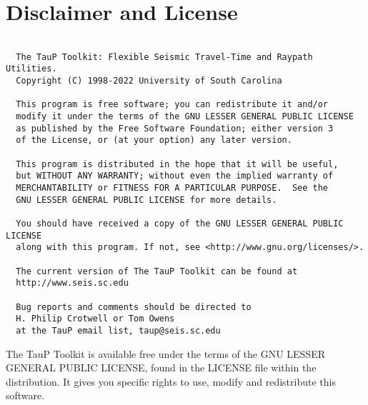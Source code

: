 
\section*{Disclaimer and License}
\begin{verbatim}

  The TauP Toolkit: Flexible Seismic Travel-Time and Raypath Utilities.
  Copyright (C) 1998-2022 University of South Carolina

  This program is free software; you can redistribute it and/or
  modify it under the terms of the GNU LESSER GENERAL PUBLIC LICENSE
  as published by the Free Software Foundation; either version 3
  of the License, or (at your option) any later version.

  This program is distributed in the hope that it will be useful,
  but WITHOUT ANY WARRANTY; without even the implied warranty of
  MERCHANTABILITY or FITNESS FOR A PARTICULAR PURPOSE.  See the
  GNU LESSER GENERAL PUBLIC LICENSE for more details.

  You should have received a copy of the GNU LESSER GENERAL PUBLIC LICENSE
  along with this program. If not, see <http://www.gnu.org/licenses/>.

  The current version of The TauP Toolkit can be found at
  http://www.seis.sc.edu

  Bug reports and comments should be directed to
  H. Philip Crotwell or Tom Owens
  at the TauP email list, taup@seis.sc.edu

\end{verbatim}

The TauP Toolkit is available free under the terms of the
GNU LESSER GENERAL PUBLIC LICENSE, found in the
LICENSE
file within the distribution. It gives you
specific rights to use, modify and redistribute this software.
